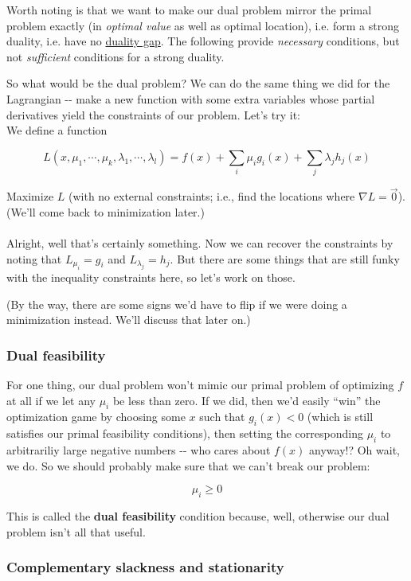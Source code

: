 \documentclass[letterpaper,12pt]{report}
\begin{document}
Worth noting is that we want to make our dual problem mirror the primal
problem exactly (in \emph{optimal value} as well as optimal location),
i.e. form a strong duality, i.e. have no
\href{https://en.wikipedia.org/wiki/Duality_gap}{duality gap}. The
following provide \emph{necessary} conditions, but not \emph{sufficient}
conditions for a strong duality.

So what would be the dual problem? We can do the same thing we did for
the Lagrangian -\/- make a new function with some extra variables whose
partial derivatives yield the constraints of our problem. Let's try it:
\\
We define a function

\[L(x,\mu_1, \cdots, \mu_k, \lambda_1, \cdots, \lambda_l) = f(x) + \sum_i \mu_i g_i(x) + \sum_j \lambda_j h_j(x)\]

Maximize \(L\) (with no external constraints; i.e., find the locations
where \(\nabla L = \vec{0}\)). (We'll come back to minimization later.)
\\
\\
Alright, well that's certainly something. Now we can recover the
constraints by noting that \(L_{\mu_i} = g_i\) and
\(L_{\lambda_j} = h_j\). But there are some things that are still funky
with the inequality constraints here, so let's work on those.

(By the way, there are some signs we'd have to flip if we were 
doing a minimization instead. We'll discuss that later on.)

\subsubsection{Dual feasibility}\label{dual-feasibility}

For one thing, our dual problem won't mimic our primal problem of
optimizing \(f\) at all if we let any \(\mu_i\) be less than zero. If we
did, then we'd easily ``win'' the optimization game by choosing some \(x\)
such that \(g_i(x) < 0\) (which is still satisfies our primal
feasibility conditions), then setting the corresponding \(\mu_i\) to
arbitrariliy large negative numbers -\/- who cares about \(f(x)\)
anyway!? Oh wait, we do. So we should probably make sure that we can't
break our problem:

\[ \mu_i \geq 0 \]

This is called the \textbf{dual feasibility} condition because, well,
otherwise our dual problem isn't all that useful.

\subsubsection{Complementary slackness and
stationarity}\label{complementary-slackness-and-stationarity}
\end{document}
